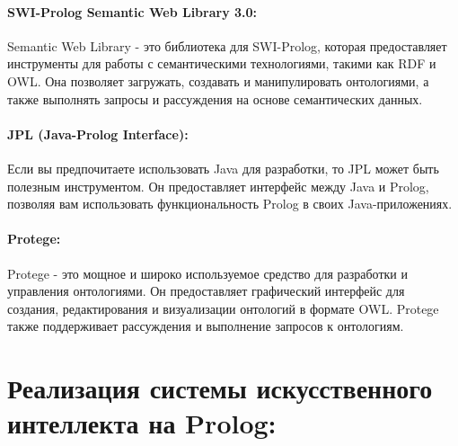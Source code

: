 \documentclass[12pt,onecolumn]{article}
\begin{document}
\paragraph{SWI-Prolog Semantic Web Library 3.0:} Semantic Web Library - это библиотека для SWI-Prolog, которая предоставляет инструменты для работы с семантическими технологиями, такими как RDF и OWL. Она позволяет загружать, создавать и манипулировать онтологиями, а также выполнять запросы и рассуждения на основе семантических данных.
\paragraph{JPL (Java-Prolog Interface):} Если вы предпочитаете использовать Java для разработки, то JPL может быть полезным инструментом. Он предоставляет интерфейс между Java и Prolog, позволяя вам использовать функциональность Prolog в своих Java-приложениях.
\paragraph{Protege:} Protege - это мощное и широко используемое средство для разработки и управления онтологиями. Он предоставляет графический интерфейс для создания, редактирования и визуализации онтологий в формате OWL. Protege также поддерживает рассуждения и выполнение запросов к онтологиям.

\section{Реализация системы искусственного интеллекта на Prolog:}
\end{document}
